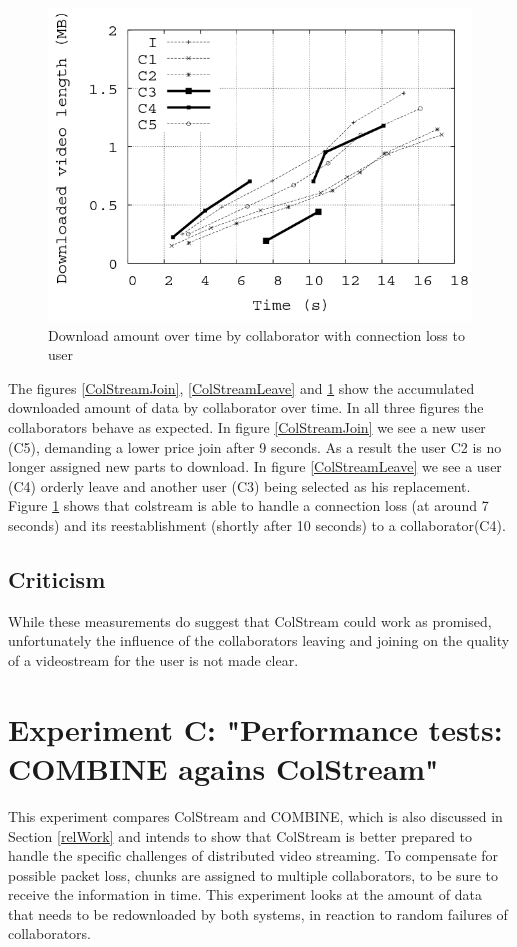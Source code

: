 \begin{figure}[hbt]
\centering
\caption{Download amount over time by collaborator with connection loss to user \cite{ColStream}}
\label{ColStreamReJoin}
\includegraphics[scale=.5]{figures/ColStreamReJoin.png}
\end{figure}
The figures \ref{ColStreamJoin}, \ref{ColStreamLeave} and \ref{ColStreamReJoin} show the accumulated downloaded amount of data by collaborator over time. In all three figures the collaborators behave as expected. In figure \ref{ColStreamJoin} we see a new user (C5), demanding a lower price join after 9 seconds. As a result the user C2 is no longer assigned new parts to download. In figure \ref{ColStreamLeave} we see a user (C4) orderly leave and another user (C3) being selected as his replacement. Figure \ref{ColStreamReJoin} shows that colstream is able to handle a connection loss (at around 7 seconds) and its reestablishment (shortly after 10 seconds) to a collaborator(C4).
\subsection{Criticism}
While these measurements do suggest that ColStream could work as promised, unfortunately the influence of the collaborators leaving and joining on the quality of a videostream for the user is not made clear.

\section{Experiment C: "Performance tests: COMBINE agains ColStream"}
This experiment compares ColStream and COMBINE, which is also discussed in Section \ref{relWork} and intends to show that ColStream is better prepared to handle the specific challenges of distributed video streaming. To compensate for possible packet loss, chunks are assigned to multiple collaborators, to be sure to receive the information in time. This experiment looks at the amount of data that needs to be redownloaded by both systems, in reaction to random failures of collaborators.
